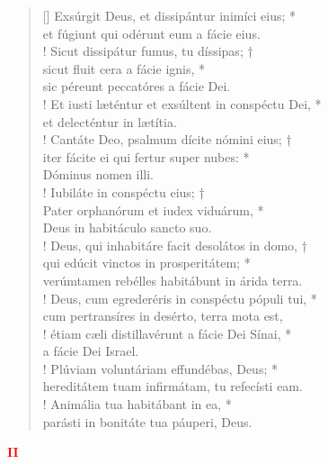 \begin{verse}[\versewidth]
Exsúrgit Deus, et dissipántur inimíci eius; *\\
et fúgiunt qui odérunt eum a fácie eius.\\!
\vin Sicut dissipátur fumus, tu díssipas; †\\
\vin sicut fluit cera a fácie ignis, *\\
\vin sic péreunt peccatóres a fácie Dei.\\!
Et iusti læténtur et exsúltent in conspéctu Dei, *\\
et delecténtur in lætítia.\\!
\vin Cantáte Deo, psalmum dícite nómini eius; †\\
\vin iter fácite ei qui fertur super nubes: *\\
\vin Dóminus nomen illi.\\!
Iubiláte in conspéctu eius; †\\
Pater orphanórum et iudex viduárum, *\\
Deus in habitáculo sancto suo.\\!
\vin Deus, qui inhabitáre facit desolátos in domo, †\\
\vin qui edúcit vinctos in prosperitátem; *\\
\vin verúmtamen rebélles habitábunt in árida terra.\\!
Deus, cum egrederéris in conspéctu pópuli tui, *\\
cum pertransíres in desérto, terra mota est,\\!
\vin étiam cæli distillavérunt a fácie Dei Sínai, *\\
\vin a fácie Dei Israel.\\!
Plúviam voluntáriam effundébas, Deus; *\\
hereditátem tuam infirmátam, tu refecísti eam.\\!
\vin Animália tua habitábant in ea, *\\
\vin parásti in bonitáte tua páuperi, Deus.\\
\end{verse}
\begin{center}
\textcolor{red}{\bf II}
\end{center}
